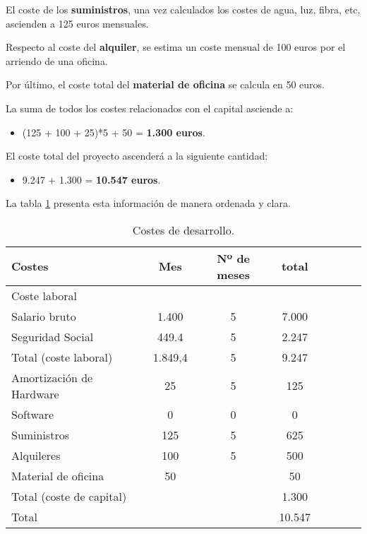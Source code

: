El coste de los \textbf{suministros}, una vez calculados los costes de agua, luz, fibra, etc, ascienden a 125 euros mensuales.

Respecto al coste del \textbf{alquiler}, se estima un coste mensual de 100 euros por el arriendo de una oficina.

Por último, el coste total del \textbf{material de oficina} se calcula en 50 euros.

La suma de todos los costes relacionados con el capital asciende a:

\begin{itemize}
	\item (125 + 100 + 25)*5 + 50 = \textbf{1.300 euros}.
\end{itemize}

El coste total del proyecto ascenderá a la siguiente cantidad:

\begin{itemize}
	\item 9.247 + 1.300 = \textbf{10.547 euros}.
\end{itemize}

La tabla \ref{table:costes} presenta esta información de manera ordenada y clara.

\begin{table}
	\centering
		\begin{tabular}{l*{6}{c}r}
		\hline
			Costes                & Mes & Nº de meses & total \\
		\hline
			Coste laboral 	  	  &		  &  &   \\
			Salario bruto         & 1.400 & 5  & 7.000  \\
			Seguridad Social      & 449.4 & 5 & 2.247\\
		\hline
			Total (coste laboral)	& 1.849,4 & 5 & 9.247   \\
		\hline
			Amortización de Hardware	& 25 & 5 & 125  \\
			Software     & 0 & 0 & 0  \\
			Suministros     & 125 & 5 & 625  \\
			Alquileres     & 100 & 5 & 500  \\
			Material de oficina   & 50  &  & 50 \\
		\hline
			Total (coste de capital)     &  &  &  1.300 \\
		\hline
			Total     &  &  &  10.547  \\
		\hline
	\end{tabular}
	\caption{Costes de desarrollo.}
	\label{table:costes}
\end{table}

